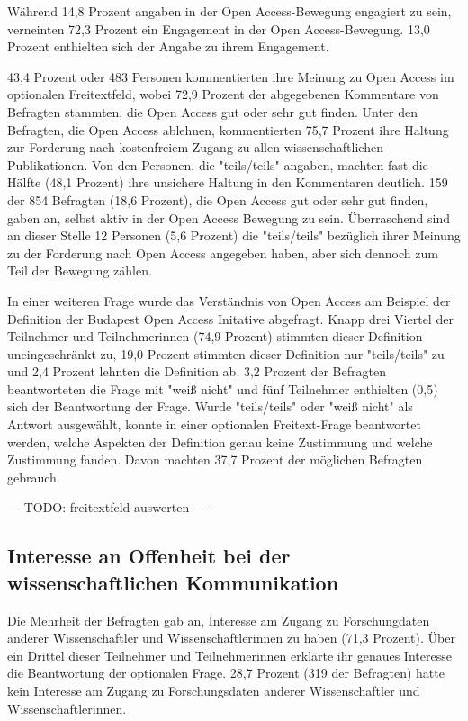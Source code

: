 Während 14,8 Prozent angaben in der Open Access-Bewegung engagiert zu sein, verneinten 72,3 Prozent ein Engagement in der Open Access-Bewegung. 13,0 Prozent enthielten sich der Angabe zu ihrem Engagement.

43,4 Prozent oder 483 Personen kommentierten ihre Meinung zu Open Access im optionalen Freitextfeld, wobei 72,9 Prozent der abgegebenen Kommentare von Befragten stammten, die Open Access gut oder sehr gut finden. Unter den Befragten, die Open Access ablehnen, kommentierten 75,7 Prozent ihre Haltung zur Forderung nach kostenfreiem Zugang zu allen wissenschaftlichen Publikationen. Von den Personen, die "teils/teils" angaben, machten fast die Hälfte (48,1 Prozent) ihre unsichere Haltung in den Kommentaren deutlich. 159 der 854 Befragten (18,6 Prozent), die Open Access gut oder sehr gut finden, gaben an, selbst aktiv in der Open Access Bewegung zu sein. Überraschend sind an dieser Stelle 12 Personen (5,6 Prozent) die "teils/teils" bezüglich ihrer Meinung zu der Forderung nach Open Access angegeben haben, aber sich dennoch zum Teil der Bewegung zählen.

In einer weiteren Frage wurde das Verständnis von Open Access am Beispiel der Definition der Budapest Open Access Initative \cite{boai_2012} abgefragt. Knapp drei Viertel der Teilnehmer und Teilnehmerinnen (74,9 Prozent) stimmten dieser Definition uneingeschränkt zu, 19,0 Prozent stimmten dieser Definition nur "teils/teils" zu und 2,4 Prozent lehnten die Definition ab. 3,2 Prozent der Befragten beantworteten die Frage mit "weiß nicht" und fünf Teilnehmer enthielten (0,5) sich der Beantwortung der Frage. Wurde "teils/teils" oder "weiß nicht" als Antwort ausgewählt, konnte in einer optionalen Freitext-Frage beantwortet werden, welche Aspekten der Definition genau keine Zustimmung und welche Zustimmung fanden. Davon machten 37,7 Prozent der möglichen Befragten gebrauch.

--- TODO: freitextfeld auswerten ----

\subsection{Interesse an Offenheit bei der wissenschaftlichen Kommunikation}

Die Mehrheit der Befragten gab an, Interesse am Zugang zu Forschungdaten anderer Wissenschaftler und Wissenschaftlerinnen zu haben (71,3 Prozent). Über ein Drittel dieser Teilnehmer und Teilnehmerinnen erklärte ihr genaues Interesse die Beantwortung der optionalen Frage. 28,7 Prozent (319 der Befragten) hatte kein Interesse am Zugang zu Forschungsdaten anderer Wissenschaftler und Wissenschaftlerinnen.

